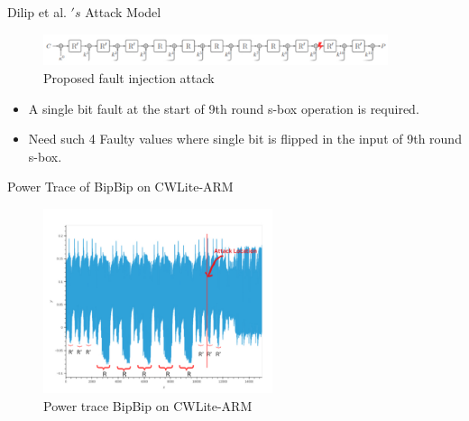 \documentclass{beamer}
\newenvironment{tres important}[2][]{
	\setkeys{EmphEqEnv}{#2}
	\setkeys{EmphEqOpt}{box={\setlength{\fboxsep}{10pt}\fcolorbox{myNewColorA}{white}},#1}
	\EmphEqMainEnv}
{\endEmphEqMainEnv}
\begin{document}
\begin{frame}[fragile]{Dilip et al. $'s$ Attack Model}
  \begin{figure}[h]
    \centering
    \includegraphics[width=0.9\textwidth]{images/bipbip_attack.png}
    \caption{Proposed fault injection attack}
    \label{fig:bipbip_attack}
\end{figure}
\begin{itemize}
\item A single bit fault at the start of 9th round s-box operation is required. 
\item Need such 4 Faulty values where single bit is flipped in the input of 9th round s-box.
\end{itemize}
\end{frame}
\begin{frame}[fragile]{Power Trace of BipBip on CWLite-ARM}
  \begin{figure}[h]
    \centering
    \includegraphics[width=0.6\textwidth]{images/bibbip_attack_loc.png}
    \caption{Power trace BipBip on CWLite-ARM}
    \label{fig:bipbip_powertrace}
\end{figure}
\end{frame}
\end{document}

